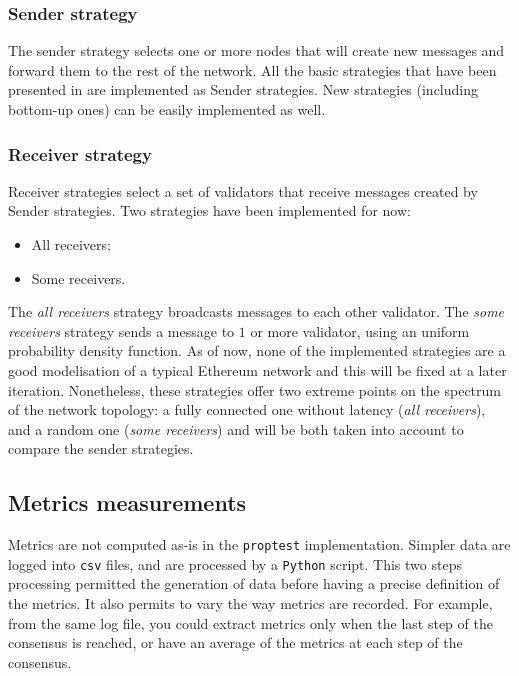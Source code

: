 \subsubsection{Sender strategy}
The sender strategy selects one or more nodes that will create new messages and
forward them to the rest of the network. All the basic strategies that have been
presented in  are implemented as Sender strategies.
New strategies (including bottom-up ones) can be easily implemented as well.

\subsubsection{Receiver strategy}
Receiver strategies select a set of validators that receive messages created by
Sender strategies. Two strategies have been implemented for now: 
\begin{itemize}
        \item All receivers;
        \item Some receivers.
\end{itemize}

The \textit{all receivers} strategy broadcasts messages to each other validator.
The \textit{some receivers} strategy sends a message to \(1\) or more validator,
using an uniform probability density function.  As of now, none of the
implemented strategies are a good modelisation of a typical Ethereum network and
this will be fixed at a later iteration.  Nonetheless, these strategies offer
two extreme points on the spectrum of the network topology: a fully connected
one without latency (\textit{all receivers}), and a random one (\textit{some
receivers}) and will be both taken into account to compare the sender
strategies.

\subsection{Metrics measurements}
Metrics are not computed as-is in the \texttt{proptest} implementation. Simpler
data are logged into \texttt{csv} files, and are processed by a \texttt{Python}
script.  This two steps processing permitted the generation of
data before having a precise definition of the metrics. It also permits to vary
the way metrics are recorded. For example, from the same log file, you could
extract metrics only when the last step of the consensus is reached, or have an
average of the metrics at each step of the consensus.


